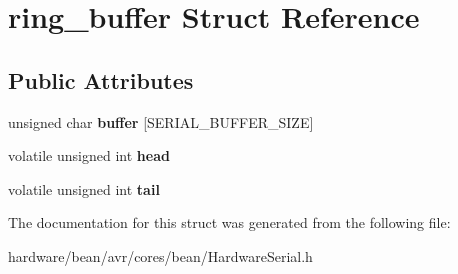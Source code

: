 \hypertarget{structring__buffer}{}\section{ring\+\_\+buffer Struct Reference}
\label{structring__buffer}
\subsection*{Public Attributes}
\begin{DoxyCompactItemize}
\item 
\hypertarget{structring__buffer_addefa0648bbe04471bbd48fc0d1485e4}{}unsigned char {\bfseries buffer} \mbox{[}S\+E\+R\+I\+A\+L\+\_\+\+B\+U\+F\+F\+E\+R\+\_\+\+S\+I\+Z\+E\mbox{]}\label{structring__buffer_addefa0648bbe04471bbd48fc0d1485e4}

\item 
\hypertarget{structring__buffer_a8de4d994abe5e644a792f0b1b46968b7}{}volatile unsigned int {\bfseries head}\label{structring__buffer_a8de4d994abe5e644a792f0b1b46968b7}

\item 
\hypertarget{structring__buffer_ab168a71ccb847120fbdeeb57b89e3aee}{}volatile unsigned int {\bfseries tail}\label{structring__buffer_ab168a71ccb847120fbdeeb57b89e3aee}

\end{DoxyCompactItemize}


The documentation for this struct was generated from the following file\+:\begin{DoxyCompactItemize}
\item 
hardware/bean/avr/cores/bean/Hardware\+Serial.\+h\end{DoxyCompactItemize}
